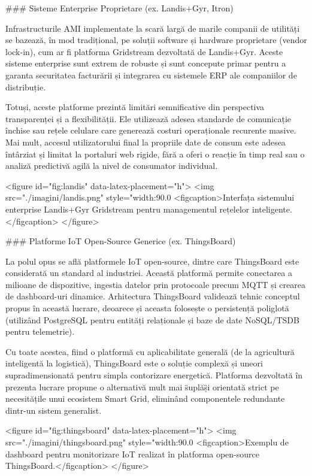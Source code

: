 ### Sisteme Enterprise Proprietare (ex. Landis+Gyr, Itron)

Infrastructurile AMI implementate la scară largă de marile companii de
utilități se bazează, în mod tradițional, pe soluții software și
hardware proprietare (vendor lock-in), cum ar fi platforma Gridstream
dezvoltată de Landis+Gyr. Aceste sisteme enterprise sunt extrem de
robuste și sunt concepute primar pentru a garanta securitatea facturării
și integrarea cu sistemele ERP ale companiilor de distribuție.

Totuși, aceste platforme prezintă limitări semnificative din perspectiva
transparenței și a flexibilității. Ele utilizează adesea standarde de
comunicație închise sau rețele celulare care generează costuri
operaționale recurente masive. Mai mult, accesul utilizatorului final la
propriile date de consum este adesea întârziat și limitat la portaluri
web rigide, fără a oferi o reacție în timp real sau o analiză predictivă
agilă la nivel de consumator individual.

<figure id="fig:landis" data-latex-placement="h">
<img src="./imagini/landis.png" style="width:90.0%
<figcaption>Interfața sistemului enterprise Landis+Gyr Gridstream pentru
managementul rețelelor inteligente.</figcaption>
</figure>

### Platforme IoT Open-Source Generice (ex. ThingsBoard)

La polul opus se află platformele IoT open-source, dintre care
ThingsBoard este considerată un standard al industriei. Această
platformă permite conectarea a milioane de dispozitive, ingestia datelor
prin protocoale precum MQTT și crearea de dashboard-uri dinamice.
Arhitectura ThingsBoard validează tehnic conceptul propus în această
lucrare, deoarece și aceasta folosește o persistență poliglotă
(utilizând PostgreSQL pentru entități relaționale și baze de date
NoSQL/TSDB pentru telemetrie).

Cu toate acestea, fiind o platformă cu aplicabilitate generală (de la
agricultură inteligentă la logistică), ThingsBoard este o soluție
complexă și uneori supradimensionată pentru simpla contorizare
energetică. Platforma dezvoltată în prezenta lucrare propune o
alternativă mult mai \"suplă\" și orientată strict pe necesitățile unui
ecosistem Smart Grid, eliminând componentele redundante dintr-un sistem
generalist.

<figure id="fig:thingsboard" data-latex-placement="h">
<img src="./imagini/thingsboard.png" style="width:90.0%
<figcaption>Exemplu de dashboard pentru monitorizare IoT realizat în
platforma open-source ThingsBoard.</figcaption>
</figure>

